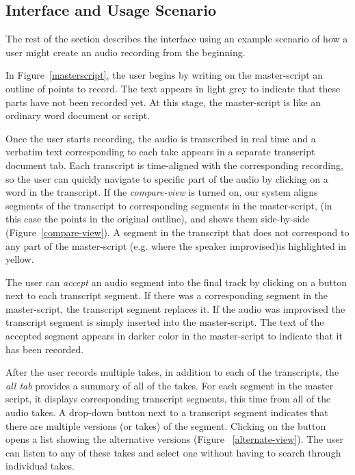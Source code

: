 \subsection{Interface and Usage Scenario}
The rest of the section describes the interface using an example scenario of how a user might create an audio recording from the beginning. 

In Figure~\ref{masterscript}, the user begins by writing on the master-script an outline  of points to record. The text appears in light grey to indicate that these parts have not been recorded yet. At this stage, the master-script is like an ordinary
word document or script. 

Once the user starts recording, the audio is transcribed in real time and a verbatim text corresponding to each take appears in a separate transcript document tab. Each transcript is time-aligned with the corresponding recording, so the user can quickly navigate to specific
part of the audio by clicking on a word in the transcript. If the \textit{compare-view} is turned on, our system aligns segments of the transcript to corresponding segments in the master-script, (in this case the points in the original outline), and shows them side-by-side (Figure~\ref{compare-view}). A segment in the transcript that does not correspond to any part of the master-script (e.g. where the speaker improvised)is highlighted in yellow.


The user can \textit{accept} an audio segment into the final track
by clicking on a button next to each transcript segment. If there was
a corresponding  segment in the master-script, the transcript segment
replaces it. If the audio was improvised the transcript segment
is simply inserted into the master-script.
The text of the accepted segment appears in
darker color in the master-script to indicate that it has been recorded. 

After the user records multiple takes, in addition to each of the transcripts, the \textit{all tab} provides a summary of all of the takes. For each segment in the master script, it displays corresponding transcript segments, this time from all of the audio takes. A drop-down button next to a transcript segment  indicates that there are multiple versions (or takes)  of the  segment. Clicking on the button opens a
list showing the alternative versions (Figure ~\ref{alternate-view}). The user can listen to any of these takes and select one without having to search through individual takes. 

